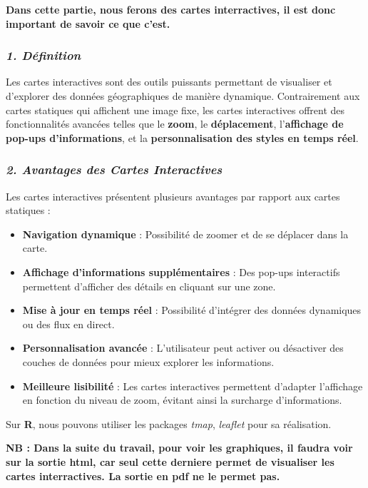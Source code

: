 \documentclass[
]{article}
\providecommand{\tightlist}{%
  \setlength{\itemsep}{0pt}\setlength{\parskip}{0pt}}
\begin{document}
\textbf{Dans cette partie, nous ferons des cartes interractives, il est
donc important de savoir ce que c'est.}

\subsubsection{\texorpdfstring{\emph{1.
Définition}}{1. Définition}}\label{duxe9finition}

Les cartes interactives sont des outils puissants permettant de
visualiser et d'explorer des données géographiques de manière dynamique.
Contrairement aux cartes statiques qui affichent une image fixe, les
cartes interactives offrent des fonctionnalités avancées telles que le
\textbf{zoom}, le \textbf{déplacement}, l'\textbf{affichage de pop-ups
d'informations}, et la \textbf{personnalisation des styles en temps
réel}.

\subsubsection{\texorpdfstring{\emph{2. Avantages des Cartes
Interactives}}{2. Avantages des Cartes Interactives}}\label{avantages-des-cartes-interactives}

Les cartes interactives présentent plusieurs avantages par rapport aux
cartes statiques :

\begin{itemize}
\tightlist
\item
  \textbf{Navigation dynamique} : Possibilité de zoomer et de se
  déplacer dans la carte.
\item
  \textbf{Affichage d'informations supplémentaires} : Des pop-ups
  interactifs permettent d'afficher des détails en cliquant sur une
  zone.
\item
  \textbf{Mise à jour en temps réel} : Possibilité d'intégrer des
  données dynamiques ou des flux en direct.
\item
  \textbf{Personnalisation avancée} : L'utilisateur peut activer ou
  désactiver des couches de données pour mieux explorer les
  informations.
\item
  \textbf{Meilleure lisibilité} : Les cartes interactives permettent
  d'adapter l'affichage en fonction du niveau de zoom, évitant ainsi la
  surcharge d'informations.
\end{itemize}

Sur \textbf{R}, nous pouvons utiliser les packages \emph{tmap},
\emph{leaflet} pour sa réalisation.

\textbf{NB : Dans la suite du travail, pour voir les graphiques, il
faudra voir sur la sortie html, car seul cette derniere permet de
visualiser les cartes interractives. La sortie en pdf ne le permet pas.}
\end{document}
